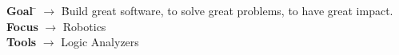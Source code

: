 

\begin{tabbing}

\textbf{Goal}
\quad \= $\rightarrow$ \quad \=
Build great software, to solve great problems, to have great impact.
\\

\textbf{Focus}
\> $\rightarrow$ \>
Robotics
\\

\textbf{Tools}
\> $\rightarrow$ \>
Logic Analyzers

\end{tabbing}








